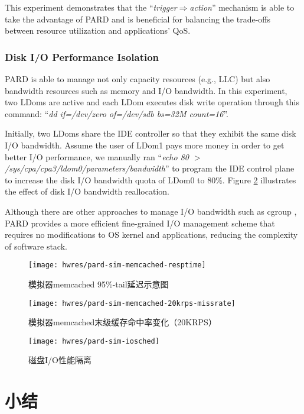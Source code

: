 This experiment demonstrates that the ``\emph{trigger$\Rightarrow$action}'' mechanism 
is able to take the advantage of PARD and is beneficial for balancing the trade-offs between
resource utilization and applications' QoS.


\subsubsection{Disk I/O Performance Isolation}\leavevmode

PARD is able to manage not only capacity resources (e.g., LLC)
but also bandwidth resources such as memory and I/O bandwidth.
In this experiment, two LDoms are active and each LDom executes
disk write operation through
this command: ``\emph{dd if=/dev/zero of=/dev/sdb bs=32M count=16}''.

Initially, two LDoms share the IDE controller so that they exhibit the same
disk I/O bandwidth. Assume the user of LDom1 pays more money in order to get
better I/O performance, we manually ran
``\emph{echo 80 $>$ /sys/cpa/cpa3/ldom0/parameters/bandwidth}''
to program the IDE control plane
to increase the disk I/O bandwidth quota of LDom0 to 80\%.
Figure \ref{fig:pardsim:iosched} illustrates the effect of disk I/O
bandwidth reallocation.

Although there are other approaches to manage I/O bandwidth such as cgroup \cite{cgroup},
PARD provides a more efficient fine-grained I/O management scheme that requires
no modifications to OS kernel and applications, reducing the complexity of software
stack.

\begin{figure}[tb]
\begin{minipage}{0.48\textwidth}
  \centering
  \texttt{[image: hwres/pard-sim-memcached-resptime]}
  \caption{模拟器memcached 95\%-tail延迟示意图}
  \label{fig:pardsim:memcached-resptime}
\end{minipage}\hfill
\begin{minipage}{0.48\textwidth}
  \centering
  \texttt{[image: hwres/pard-sim-memcached-20krps-missrate]}
  \caption{模拟器memcached末级缓存命中率变化（20KRPS）}
  \label{fig:pardsim:memcached-20krps-missrate}
\end{minipage}
\end{figure}

\begin{figure}[tb]
  \centering
  \texttt{[image: hwres/pard-sim-iosched]}
  \caption{磁盘I/O性能隔离}
  \label{fig:pardsim:iosched}
\end{figure}

\section{小结}

